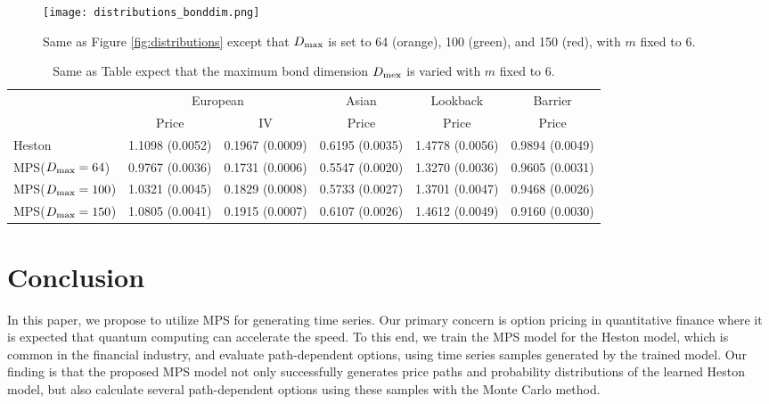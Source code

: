 {\begin{figure}[H]
    \centering
    \texttt{[image: distributions\_bonddim.png]}
    \caption{Same as Figure \ref{fig:distributions} except that $D_{\rm max}$ is set to 64 (orange), 100 (green), and 150 (red), with $m$ fixed to 6.}
    \label{fig:distributions_bonddim}
\end{figure}

\begin{table}[h]
    \centering
    \small
    \tabcolsep=1.5mm
    \begin{tabular}{l|ccccc}
             & \multicolumn{2}{c}{European} & Asian  & Lookback & Barrier  \\
             & Price & IV & Price & Price & Price \\
    \hline
    Heston   & 1.1098 (0.0052) & 0.1967  (0.0009) & 0.6195  (0.0035) & 1.4778  (0.0056)  & 0.9894  (0.0049)      \\
    MPS($D_{\rm max}=64$) & 0.9767 (0.0036)  & 0.1731   (0.0006) & 0.5547  (0.0020) & 1.3270  (0.0036)  & 0.9605  (0.0031)    \\
    MPS($D_{\rm max}=100$) & 1.0321 (0.0045) & 0.1829  (0.0008) & 0.5733  (0.0027) & 1.3701  (0.0047) & 0.9468  (0.0026) \\
    MPS($D_{\rm max}=150$) & 1.0805 (0.0041)   & 0.1915  (0.0007) & 0.6107   (0.0026) & 1.4612   (0.0049) & 0.9160  (0.0030)       
    \end{tabular}
    \normalsize
    \caption{Same as Table  expect that the maximum bond dimension $D_{\rm mex}$ is varied with $m$ fixed to 6.}
    \label{tab:result_bonddim}
\end{table}



\section{Conclusion}\label{sec:conclusion}
In this paper, we propose to utilize MPS for generating time series. 
Our primary concern is option pricing in quantitative finance where it is expected that quantum computing can accelerate the speed. 
To this end, we train the MPS model for the Heston model, which is common in the financial industry, and evaluate path-dependent options, using time series samples generated by the trained model.
Our finding is that the proposed MPS model not only successfully generates price paths and probability distributions of the learned Heston model, but also calculate several path-dependent options using these samples with the Monte Carlo method.

}
